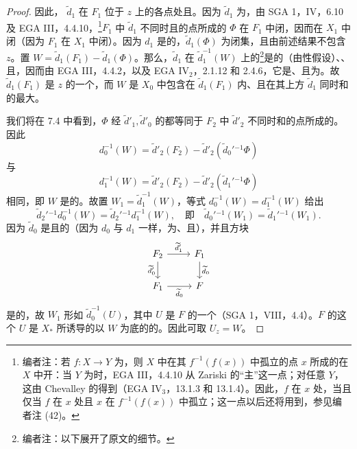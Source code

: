 \begin{proof}
因此， $\widetilde d_1$ 在 $F_1$ 位于 $z$ 上的各点处且。因为 $\widetilde d_1$ 为，由 SGA 1，IV，6.10 及 EGA III，4.4.10，\footnote{编者注：若 $f:X\to Y$ 为，则 $X$ 中在其 $f^{-1}(f(x))$ 中孤立的点 $x$ 所成的在 $X$ 中开：当 $Y$ 为时，EGA III，4.4.10 从 Zariski 的“主”这一点；对任意 $Y$，这由 Chevalley 的得到（EGA IV$_3$，13.1.3 和 13.1.4）。因此，$f$ 在 $x$ 处，当且仅当 $f$ 在 $x$ 处且 $x$ 在 $f^{-1}(f(x))$ 中孤立；这一点以后还将用到，参见编者注 (42)。}$F_1$ 中 $\widetilde d_1$ 不同时且的点所成的 $\Phi$ 在 $F_1$ 中闭，因而在 $X_1$ 中闭（因为 $F_1$ 在 $X_1$ 中闭）。因为 $d_1$ 是的，$\widetilde d_1(\Phi)$ 为闭集，且由前述结果不包含 $z$。置 $W=\widetilde d_1(F_1)-\widetilde d_1(\Phi)$。那么，$\widetilde d_1$ 在 $\widetilde d_1^{-1}(W)$ 上的\footnote{编者注：以下展开了原文的细节。}是的（由性假设）、、且，因而由 EGA III，4.4.2，以及 EGA IV$_2$，2.1.12 和 2.4.6，它是、且为。故 $\widetilde d_1(F_1)$ 是 $z$ 的一个，而 $W$ 是 $X_0$ 中包含在 $\widetilde d_1(F_1)$ 内、且在其上方 $\widetilde d_1$ 同时和的最大。

我们将在 7.4 中看到，$\Phi$ 经 $\widetilde d'_1,\widetilde d'_0$ 的都等同于 $F_2$ 中 $\widetilde d'_2$ 不同时和的点所成的。因此
\[
d_0^{-1}(W)=\widetilde d'_2(F_2)-\widetilde d'_2(\widetilde d_0'{}^{-1}\Phi)
\]
与
\[
d_1^{-1}(W)=\widetilde d'_2(F_2)-\widetilde d'_2(\widetilde d_1'{}^{-1}\Phi)
\]
相同，即 $W$ 是的。故置 $W_1=\widetilde d_1^{-1}(W)$，等式 $d_0^{-1}(W)=d_1^{-1}(W)$ 给出
\[
\widetilde d_2'{}^{-1}d_0^{-1}(W)=\widetilde d_2'{}^{-1}d_1^{-1}(W),
\quad\text{即}\quad
\widetilde d_0'{}^{-1}(W_1)=\widetilde d_1'{}^{-1}(W_1).
\]
因为 $\widetilde d_0$ 是且的（因为 $d_0$ 与 $d_1$ 一样，为、且），并且方块
\[
\begin{tikzcd}
F_2\arrow[r,"\widetilde d'_1"]\arrow[d,"\widetilde d'_0"']&F_1\arrow[d,"\widetilde d_0"]\\
F_1\arrow[r,"\widetilde d_0"']&F
\end{tikzcd}
\]
是的，故 $W_1$ 形如 $\widetilde d_0^{-1}(U)$，其中 $U$ 是 $F$ 的一个（SGA 1，VIII，4.4）。$F$ 的这个 $U$ 是 $X_*$ 所诱导的以 $W$ 为底的的。因此可取 $U_z=W$。
\end{proof}
